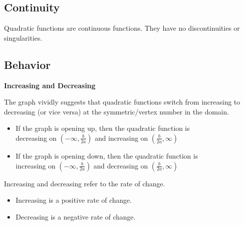 \documentclass{ximera}
\begin{document}
\subsection{Continuity}

Quadratic functions are continuous functions.  They have no discontinuities or singularities. \\














\subsection{Behavior}



\textbf{\textcolor{blue!55!black}{Increasing and Decreasing}}






The graph vividly suggests that quadratic functions switch from increasing to decreasing (or vice versa) at the symmetric/vertex number in the domain.


\begin{itemize}
\item If the graph is opening up, then the quadratic function is \\

decreasing on $\left( -\infty, \frac{b}{2a} \right)$ and increasing on $\left( \frac{b}{2a}, \infty \right)$

\item If the graph is opening down, then the quadratic function is \\

increasing on $\left( -\infty, \frac{b}{2a} \right)$ and decreasing on $\left( \frac{b}{2a}, \infty \right)$
\end{itemize}





Increasing and decreasing refer to the rate of change.


\begin{itemize}
\item Increasing is a positive rate of change.
\item Decreasing is a negative rate of change.
\end{itemize}
\end{document}
